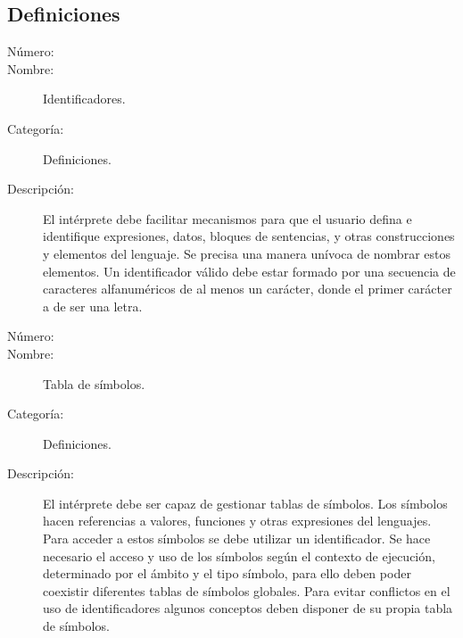 \subsection{Definiciones}

\begin{framed}
	\begin{description}
		\item [Número:] \cn
		\item [Nombre:] Identificadores.
		\item [Categoría:] Definiciones.
		\item [Descripción:]  El intérprete debe facilitar mecanismos para que el usuario defina e identifique expresiones, datos, bloques de sentencias, y
		otras construcciones y elementos del lenguaje. Se precisa una manera unívoca de nombrar estos elementos. Un identificador válido debe estar
		formado por una secuencia de caracteres alfanuméricos de al menos un carácter, donde el primer carácter a de ser una letra.
	\end {description}
\end{framed}

\begin{framed}
	\begin{description}
		\item [Número:] \cn
		\item [Nombre:] Tabla de símbolos.
		\item [Categoría:] Definiciones.
		\item [Descripción:] El intérprete debe ser capaz de gestionar tablas de símbolos. Los símbolos
		hacen referencias a valores, funciones y otras expresiones del lenguajes. Para acceder a estos símbolos
		se debe utilizar un identificador. Se hace necesario el acceso y uso de los símbolos según el contexto
		de ejecución, determinado por el ámbito y el tipo símbolo, para ello deben poder coexistir diferentes
		tablas de símbolos globales. Para evitar conflictos en el uso de identificadores algunos conceptos 
      deben disponer de su propia tabla de símbolos.
		
	\end {description}
\end{framed}

